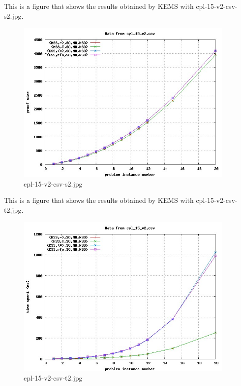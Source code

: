 This is a figure that shows the results obtained by KEMS with cpl-15-v2-csv-s2.jpg.
\begin{figure}[htbp]
\begin{center}
\includegraphics[width=0.95\textwidth]{figuras/cpl-15-v2-csv-s2.jpg}
\end{center}
\caption{cpl-15-v2-csv-s2.jpg}
\end{figure}

This is a figure that shows the results obtained by KEMS with cpl-15-v2-csv-t2.jpg.
\begin{figure}[htbp]
\begin{center}
\includegraphics[width=0.95\textwidth]{figuras/cpl-15-v2-csv-t2.jpg}
\end{center}
\caption{cpl-15-v2-csv-t2.jpg}
\end{figure}

